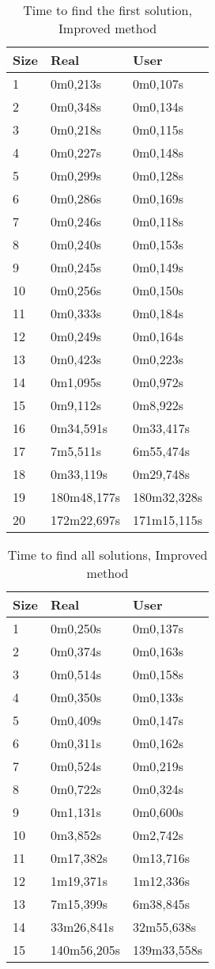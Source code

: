 \documentclass[runningheads]{llncs}
\begin{document}
\paragraph{}
\begin{table}[H]
\centering
\caption{Time to find the first solution, Improved method}\label{IAVF}
\begin{tabular}{|l|l|l|}
\hline
Size & Real & User\\
\hline
1 & 0m0,213s & 0m0,107s\\
2 & 0m0,348s & 0m0,134s\\
3 & 0m0,218s & 0m0,115s\\
4 & 0m0,227s & 0m0,148s\\
5 & 0m0,299s & 0m0,128s\\
6 & 0m0,286s & 0m0,169s\\
7 & 0m0,246s & 0m0,118s\\
8 & 0m0,240s & 0m0,153s\\
9 & 0m0,245s & 0m0,149s\\
10 & 0m0,256s & 0m0,150s\\
11 & 0m0,333s & 0m0,184s\\
12 & 0m0,249s & 0m0,164s\\
13 & 0m0,423s & 0m0,223s\\
14 & 0m1,095s & 0m0,972s\\
15 & 0m9,112s & 0m8,922s\\
16 & 0m34,591s & 0m33,417s\\
17 & 7m5,511s & 6m55,474s\\
18 & 0m33,119s & 0m29,748s\\
19 & 180m48,177s & 180m32,328s\\
20 & 172m22,697s & 171m15,115s\\
\hline
\end{tabular}
\end{table}

\begin{table}[H]
\centering
\caption{Time to find all solutions, Improved method}\label{IAVA}
\begin{tabular}{|l|l|l|}
\hline
Size & Real & User\\
\hline
1 & 0m0,250s & 0m0,137s\\
2 & 0m0,374s & 0m0,163s\\
3 & 0m0,514s & 0m0,158s\\
4 & 0m0,350s & 0m0,133s\\
5 & 0m0,409s & 0m0,147s\\
6 & 0m0,311s & 0m0,162s\\
7 & 0m0,524s & 0m0,219s\\
8 & 0m0,722s & 0m0,324s\\
9 & 0m1,131s & 0m0,600s\\
10 & 0m3,852s & 0m2,742s\\
11 & 0m17,382s & 0m13,716s\\
12 & 1m19,371s & 1m12,336s\\
13 & 7m15,399s & 6m38,845s\\
14 & 33m26,841s & 32m55,638s\\
15 & 140m56,205s & 139m33,558s\\
\hline
\end{tabular}
\end{table}
\end{document}
